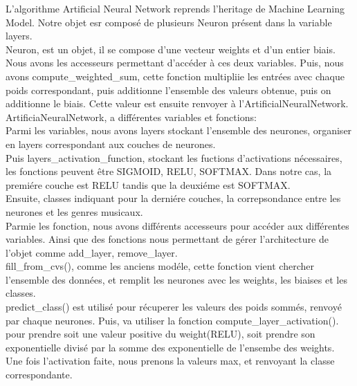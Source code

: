 \documentclass[10pt]{article}
\begin{document}
\begin{minipage}[t]{0.7\linewidth}
L'algorithme Artificial Neural Network reprends l'heritage de Machine Learning Model. Notre objet esr composé de plusieurs Neuron présent dans la variable layers.\\

Neuron, est un objet, il se compose d'une vecteur weights et d'un entier biais. Nous avons les accesseurs permettant d'accéder à ces deux variables. 
Puis, nous avons compute\_weighted\_sum, cette fonction multipliie les entrées avec chaque poids correspondant, puis additionne l'ensemble des valeurs obtenue, puis on additionne le biais. Cette valeur est ensuite renvoyer à l'ArtificialNeuralNetwork. \\

ArtificiaNeuralNetwork, a différentes variables et fonctions:\\
Parmi les variables, nous avons layers stockant l'ensemble des neurones, organiser en layers correspondant aux couches de neurones. \\
Puis layers\_activation\_function, stockant les fuctions d'activations nécessaires, les fonctions peuvent être SIGMOID, RELU, SOFTMAX. Dans notre cas, la premiére couche est RELU tandis que la deuxiéme est SOFTMAX.\\ Ensuite, classes indiquant pour la derniére couches, la correpsondance entre les neurones et les genres musicaux.\\

Parmie les fonction, nous avons  différents accesseurs pour accéder aux différentes variables. Ainsi que des fonctions nous permettant de gérer l'architecture de l'objet comme add\_layer, remove\_layer.\\
fill\_from\_cvs(), comme les anciens modéle, cette fonction vient chercher l'ensemble des données, et remplit les neurones avec les weights, les biaises et les classes.\\
predict\_class() est utilisé pour récuperer les valeurs des poids sommés, renvoyé par chaque neurones. Puis, va utiliser la fonction compute\_layer\_activation(). pour prendre soit une valeur positive du weight(RELU), soit prendre son exponentielle divisé par la somme des exponentielle de l'ensembe des weights. Une fois l'activation faite, nous prenons la valeurs max, et renvoyant la classe correspondante.\\


\end{minipage}
\end{document}
